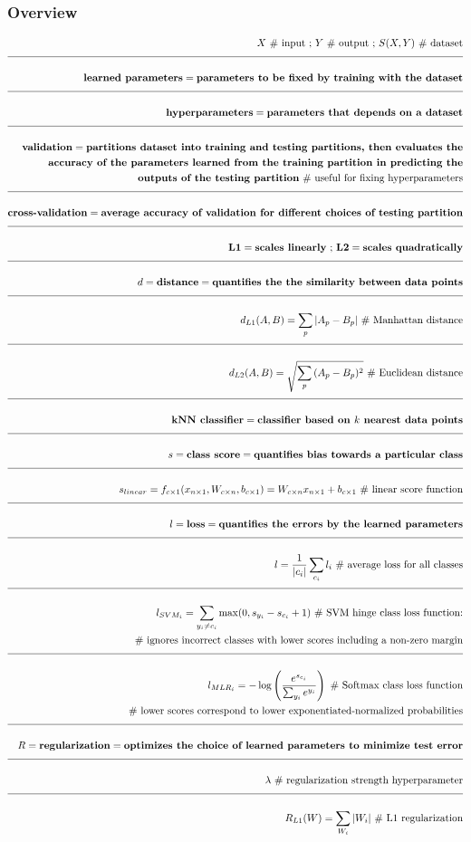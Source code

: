 \documentclass[a4paper]{article}
\newcommand{\eqComment}[1]{\text{  \# #1}}
\newcommand{\eqSep}{\text{ ;  }}
\newcommand{\n}{\\[1.5ex] \hline \nonumber \\[0ex]}
\newcommand{\m}{\nonumber \\}
\begin{document}
\subsubsection{Overview} %
\begin{tcolorbox}
\begin{align}
   X \eqComment{input} \eqSep Y \eqComment{output} \eqSep S(X, Y) \eqComment{dataset}
\n \textbf{learned parameters} = \textbf{parameters to be fixed by training with the dataset}
\n \textbf{hyperparameters} = \textbf{parameters that depends on a dataset}
\n \textbf{validation} = \textbf{partitions dataset into training and testing partitions, then evaluates the}
\m \textbf{accuracy of the parameters learned from the training partition in predicting the}
\m \textbf{outputs of the testing partition} \eqComment{useful for fixing hyperparameters}
\n \textbf{cross-validation} = \textbf{average accuracy of validation for different choices of testing partition}
\n \textbf{L1} = \textbf{scales linearly} \eqSep \textbf{L2} = \textbf{scales quadratically}
\n d = \textbf{distance} = \textbf{quantifies the the similarity between data points}
\n d_{L1}(A, B) = \sum_p{|A_p - B_p|} \eqComment{Manhattan distance}
\n d_{L2}(A, B) = \sqrt{\sum_p{(A_p - B_p)^2}} \eqComment{Euclidean distance}
\n \textbf{kNN classifier} = \textbf{classifier based on $k$ nearest data points} 
\n s = \textbf{class score} = \textbf{quantifies bias towards a particular class}
\n s_{linear} = f_{c \times 1}(x_{n \times 1}, W_{c \times n}, b_{c \times 1}) = W_{c \times n} x_{n \times 1} + b_{c \times 1} \eqComment{linear score function}
\n l = \textbf{loss} = \textbf{quantifies the errors by the learned parameters}
\n l = \frac{1}{|c_i|} \sum_{c_i} l_i \eqComment{average loss for all classes}
\n l_{SVM_i} =  \sum_{y_i \neq c_i} \max(0, s_{y_i} - s_{c_i} + 1) \eqComment{SVM hinge class loss function:}
\m \eqComment{ignores incorrect classes with lower scores including a non-zero margin}
\n l_{MLR_i} = -\log\left(\frac{e^{s_{c_i}}}{\sum_{y_i} e^{y_i}}\right) \eqComment{Softmax class loss function}
\m \eqComment{lower scores correspond to lower exponentiated-normalized probabilities}
\n R = \textbf{regularization} = \textbf{optimizes the choice of learned parameters to minimize test error}
\n \lambda \eqComment{regularization strength hyperparameter}
\n R_{L1}(W) = \sum_{W_i} |W_i| \eqComment{L1 regularization}

\end{align}
\end{tcolorbox}
\end{document}
